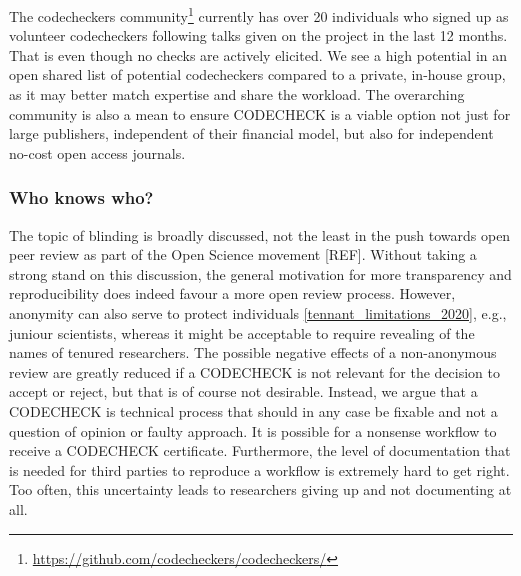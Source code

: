 \documentclass[12pt]{article}
\begin{document}
The codecheckers community\footnote{\href{https://github.com/codecheckers/codecheckers/}{https://github.com/codecheckers/codecheckers/}}
currently has over 20 individuals who signed up as volunteer codecheckers
following talks given on the project in the last 12 months.
That is even though no checks are actively elicited.
We see a high potential in an open shared list of potential codecheckers 
compared to a private, in-house group, as it may better match expertise
and share the workload.
The overarching community is also a mean to ensure CODECHECK is a viable
option not just for large publishers, independent of their financial model,
but also for independent no-cost open access journals.

\subsubsection*{Who knows who?}\label{who-knows-who}

The topic of blinding is broadly discussed, not the least in the push towards
open peer review as part of the Open Science movement [REF]. Without taking
a strong stand on this discussion, the general motivation for more 
transparency and reproducibility does indeed favour a more open review 
process. However, anonymity can also serve to protect individuals 
\ref{tennant_limitations_2020}, e.g.,  juniour scientists, whereas it might 
be acceptable to require revealing of the names of tenured researchers.
The possible negative effects of a non-anonymous review are greatly reduced
if a CODECHECK is not relevant for the decision to accept or reject, but that
is of course not desirable. Instead, we argue that a CODECHECK is technical
process that should in any case be fixable and not a question of opinion or
faulty approach. It is possible for a nonsense workflow to receive a 
CODECHECK certificate.
Furthermore, the level of documentation that is needed for third parties
to reproduce a workflow is extremely hard to get right. Too often, this 
uncertainty leads to researchers giving up and not documenting at all.
\end{document}
